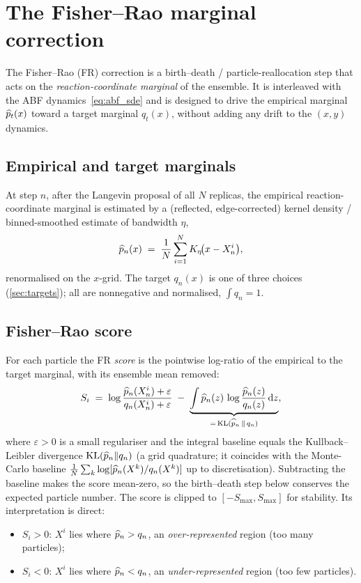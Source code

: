\section{The Fisher--Rao marginal correction}
\label{sec:fr}

The Fisher--Rao (FR) correction is a birth--death / particle-reallocation step
that acts on the \emph{reaction-coordinate marginal} of the ensemble. It is
interleaved with the ABF dynamics~\eqref{eq:abf_sde} and is designed to drive the
empirical marginal $\widehat{p}_t(x)$ toward a target marginal $q_t(x)$, without
adding any drift to the $(x,y)$ dynamics.

\subsection{Empirical and target marginals}
At step $n$, after the Langevin proposal of all $N$ replicas, the empirical
reaction-coordinate marginal is estimated by a (reflected, edge-corrected)
kernel density / binned-smoothed estimate of bandwidth $\eta$,
\begin{equation}
  \widehat{p}_{n}(x) \;=\; \frac{1}{N}\sum_{i=1}^{N} K_\eta\!\bigl(x-X_n^i\bigr),
  \label{eq:phat}
\end{equation}
renormalised on the $x$-grid. The target $q_n(x)$ is one of three choices
(\cref{sec:targets}); all are nonnegative and normalised, $\int q_n=1$.

\subsection{Fisher--Rao score}
For each particle the FR \emph{score} is the pointwise log-ratio of the
empirical to the target marginal, with its ensemble mean removed:
\begin{equation}
  S_i \;=\;
  \log\frac{\widehat{p}_n(X^i_n)+\varepsilon}{q_n(X^i_n)+\varepsilon}
  \;-\;
  \underbrace{\int \widehat{p}_n(z)\,\log\frac{\widehat{p}_n(z)}{q_n(z)}\,\mathrm{d} z}
  _{=\,\mathrm{KL}(\widehat{p}_n\,\Vert\,q_n)} ,
  \label{eq:score}
\end{equation}
where $\varepsilon>0$ is a small regulariser and the integral baseline equals
the Kullback--Leibler divergence $\mathrm{KL}(\widehat{p}_n\Vert q_n)$ (a grid
quadrature; it coincides with the Monte-Carlo baseline
$\tfrac1N\sum_k\log[\widehat{p}_n(X^k)/q_n(X^k)]$ up to discretisation). Subtracting
the baseline makes the score mean-zero, so the birth--death step below conserves
the expected particle number. The score is clipped to $[-S_{\max},S_{\max}]$
for stability. Its interpretation is direct:
\begin{itemize}
  \item $S_i>0$: $X^i$ lies where $\widehat{p}_n>q_n$, an \emph{over-represented}
        region (too many particles);
  \item $S_i<0$: $X^i$ lies where $\widehat{p}_n<q_n$, an \emph{under-represented}
        region (too few particles).
\end{itemize}

